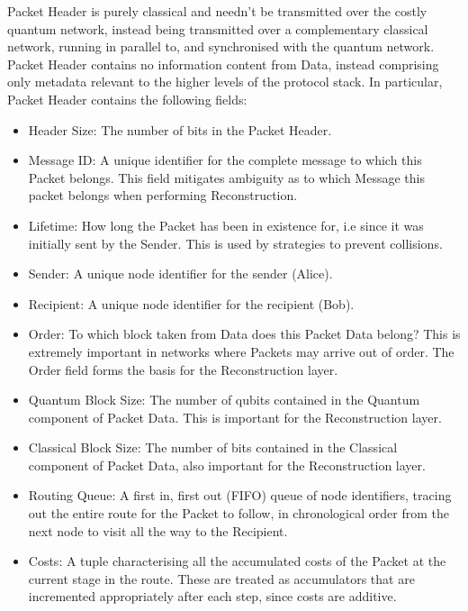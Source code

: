 \documentclass[aps,rmp,twocolumn,amsmath,amssymb,nofootinbib,superscriptaddress,longbibliography,floatfix]{revtex4-1}
\begin{document}
{\sc Packet Header} is purely classical and needn't be transmitted over the costly quantum network, instead being transmitted over a complementary classical network, running in parallel to, and synchronised with the quantum network. {\sc Packet Header} contains no information content from {\sc Data}, instead comprising only metadata relevant to the higher levels of the protocol stack. In particular, {\sc Packet Header} contains the following fields:
\begin{itemize}
    \item {\sc Header Size}: The number of bits in the {\sc Packet Header}.
    \item {\sc Message ID}: A unique identifier for the complete message to which this {\sc Packet} belongs. This field mitigates ambiguity as to which {\sc Message} this packet belongs when performing {\sc Reconstruction}.
    \item {\sc Lifetime}: How long the {\sc Packet} has been in existence for, i.e since it was initially sent by the {\sc Sender}. This is used by strategies to prevent collisions.
    \item {\sc Sender}: A unique node identifier for the sender (Alice).
    \item {\sc Recipient}: A unique node identifier for the recipient (Bob).
    \item {\sc Order}: To which block taken from {\sc Data} does this {\sc Packet Data} belong? This is extremely important in networks where {\sc Packets} may arrive out of order. The {\sc Order} field forms the basis for the {\sc Reconstruction} layer.
    \item {\sc Quantum Block Size}: The number of qubits contained in the {\sc Quantum} component of {\sc Packet Data}. This is important for the {\sc Reconstruction} layer.
    \item {\sc Classical Block Size}: The number of bits contained in the {\sc Classical} component of {\sc Packet Data}, also important for the {\sc Reconstruction} layer.
    \item {\sc Routing Queue}: A first in, first out (FIFO) queue of node identifiers, tracing out the entire route for the {\sc Packet} to follow, in chronological order from the next node to visit all the way to the {\sc Recipient}.
    \item {\sc Costs}: A tuple characterising all the accumulated costs of the {\sc Packet} at the current stage in the route. These are treated as accumulators that are incremented appropriately after each step, since costs are additive.

\end{itemize}
\end{document}
